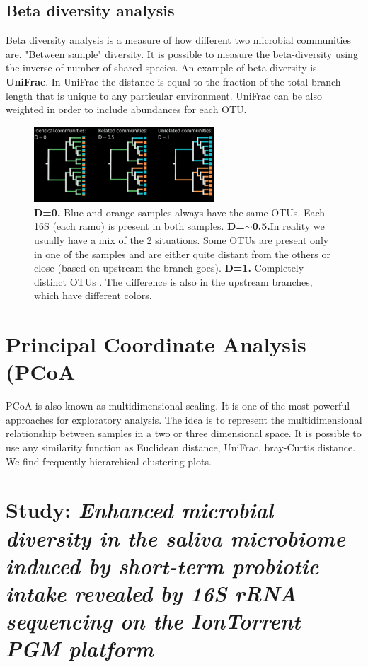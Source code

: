 \subsection{Beta diversity analysis}

Beta diversity analysis is a measure of how different two microbial communities are. "Between sample" diversity. It is possible to measure the beta-diversity using the inverse of number of shared species.
An example of beta-diversity is \textbf{UniFrac}. In UniFrac the distance is equal to the fraction of the total branch length that is unique to any particular environment. UniFrac can be also weighted in order to include abundances for each OTU.

\begin{figure}[h]
\centering
\includegraphics[width=0.6\textwidth]{UniFrac.png}
\caption{\textbf{D=0.} Blue and orange samples always have the same OTUs. Each 16S (each ramo) is present in both samples. \textbf{D=$\sim$0.5.}In reality we usually have a mix of the 2 situations. Some OTUs are present only in one of the samples and are either quite distant from the others or close (based on upstream the branch goes). \textbf{D=1.} Completely distinct OTUs . The difference is also in the upstream branches, which have different colors.}
\end{figure}

\section{Principal Coordinate Analysis (PCoA}

PCoA is also known as multidimensional scaling. It is one of the most powerful approaches for exploratory analysis. The idea is to represent the multidimensional relationship between samples in a two or three dimensional space. It is possible to use any similarity function as Euclidean distance, UniFrac, bray-Curtis distance. We find frequently hierarchical clustering plots. 

\section{Study: \textit{Enhanced microbial diversity in the saliva microbiome induced by short-term probiotic intake revealed by 16S rRNA sequencing on the IonTorrent PGM platform}}

